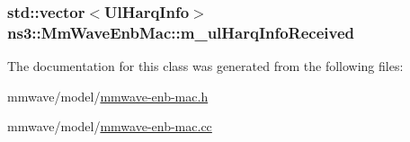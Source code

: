 \subsubsection[{\texorpdfstring{m\+\_\+ul\+Harq\+Info\+Received}{m_ulHarqInfoReceived}}]{\setlength{\rightskip}{0pt plus 5cm}std\+::vector$<${\bf Ul\+Harq\+Info}$>$ ns3\+::\+Mm\+Wave\+Enb\+Mac\+::m\+\_\+ul\+Harq\+Info\+Received\hspace{0.3cm}{\ttfamily [private]}}\hypertarget{classns3_1_1MmWaveEnbMac_a6beff4b0a92540e9be34e5d2fa2c7842}{}\label{classns3_1_1MmWaveEnbMac_a6beff4b0a92540e9be34e5d2fa2c7842}


The documentation for this class was generated from the following files\+:\begin{DoxyCompactItemize}
\item 
mmwave/model/\hyperlink{mmwave-enb-mac_8h}{mmwave-\/enb-\/mac.\+h}\item 
mmwave/model/\hyperlink{mmwave-enb-mac_8cc}{mmwave-\/enb-\/mac.\+cc}\end{DoxyCompactItemize}
